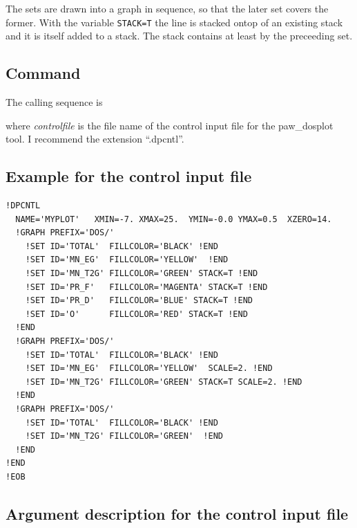 \documentclass[final,12pt]{article}
\begin{document}
{{{The sets are drawn into a graph in sequence, so that the later set
covers the former. With the variable \texttt{STACK=T} the line is
stacked ontop of an existing stack and it is itself added to a
stack. The stack contains at least by the preceeding set.


\subsection{Command}

The calling sequence is

\bigskip{}\bigskip

\noindent
where {\it controlfile} is the file name of the control input file for
the paw\_dosplot tool. I recommend the extension ``.dpcntl''.




\subsection{Example for the control input file}

\begin{verbatim}
!DPCNTL
  NAME='MYPLOT'   XMIN=-7. XMAX=25.  YMIN=-0.0 YMAX=0.5  XZERO=14.
  !GRAPH PREFIX='DOS/'
    !SET ID='TOTAL'  FILLCOLOR='BLACK' !END
    !SET ID='MN_EG'  FILLCOLOR='YELLOW'  !END
    !SET ID='MN_T2G' FILLCOLOR='GREEN' STACK=T !END
    !SET ID='PR_F'   FILLCOLOR='MAGENTA' STACK=T !END
    !SET ID='PR_D'   FILLCOLOR='BLUE' STACK=T !END
    !SET ID='O'      FILLCOLOR='RED' STACK=T !END
  !END
  !GRAPH PREFIX='DOS/' 
    !SET ID='TOTAL'  FILLCOLOR='BLACK' !END
    !SET ID='MN_EG'  FILLCOLOR='YELLOW'  SCALE=2. !END
    !SET ID='MN_T2G' FILLCOLOR='GREEN' STACK=T SCALE=2. !END
  !END
  !GRAPH PREFIX='DOS/'
    !SET ID='TOTAL'  FILLCOLOR='BLACK' !END
    !SET ID='MN_T2G' FILLCOLOR='GREEN'  !END
  !END
!END
!EOB
\end{verbatim}

\newpage
\subsection{Argument description for the control input file}

}}}
\end{document}
